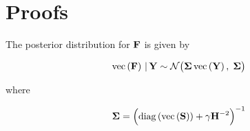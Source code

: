 
\chapter{Proofs} %

\label{AppendixA} %


\begin{theorem}

    \label{the:F_posterior}
    The posterior distribution for $\mathbf{F}$ is given by 

    \begin{equation}
            \text{\textup{vec}}\left(\mathbf{F}\right) \, | \, \mathbf{Y} \sim \mathcal{N} \big(\mathbf{\Sigma} \, \text{\textup{vec}}\left(\mathbf{Y}\right), \; \mathbf{\Sigma} \big)
        \end{equation}
        
        \noindent where 
        
        \begin{equation}
            \mathbf{\Sigma} = \Big(\text{\textup{diag}}\left(\text{\textup{vec}}\left(\mathbf{S}\right)\right) + \gamma  \mathbf{H}^{-2}\Big)^{-1}
        \end{equation}

\end{theorem}

